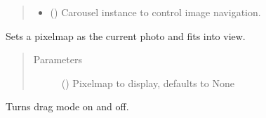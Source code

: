 \documentclass[letterpaper,10pt,english]{sphinxmanual}
\begin{document}
\begin{fulllineitems}
\begin{fulllineitems}
\begin{quote}
\begin{description}
\begin{itemize}
\item {} 
 ({\hyperref[\detokenize{polo.widgets:polo.widgets.slideshow_viewer.Carousel}]{}}) \textendash{} Carousel instance to control image navigation.

\end{itemize}

\end{description}\end{quote}

\end{fulllineitems}


\begin{fulllineitems}
\label{\detokenize{polo.widgets:polo.widgets.slideshow_viewer.PhotoViewer.set_image}}
Sets a pixelmap as the current photo and fits into view.
\begin{quote}\begin{description}
\item[{Parameters}] \leavevmode
{} (\sphinxstyleliteralemphasis{\sphinxupquote{, }}) \textendash{} Pixelmap to display, defaults to None

\end{description}\end{quote}

\end{fulllineitems}


\begin{fulllineitems}
\label{\detokenize{polo.widgets:polo.widgets.slideshow_viewer.PhotoViewer.toggleDragMode}}
Turns drag mode on and off.

\end{fulllineitems}


\end{fulllineitems}
\end{document}
